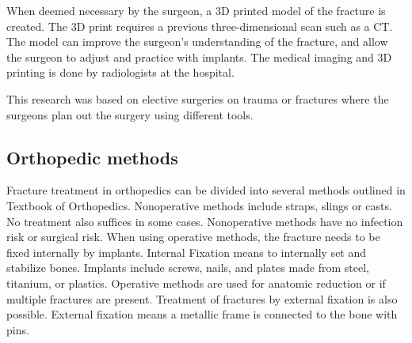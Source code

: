 \documentclass[a4paper]{report}
\begin{document}
When deemed necessary by the surgeon, a 3D printed model of the fracture is created. The 3D print requires a previous three-dimensional scan such as a CT. The model can improve the surgeon's understanding of the fracture, and allow the surgeon to adjust and practice with implants. The medical imaging and 3D printing is done by radiologists at the hospital.

This research was based on elective surgeries on trauma or fractures where the surgeons plan out the surgery using different tools.

\subsection{Orthopedic methods}

Fracture treatment in orthopedics can be divided into several methods outlined in Textbook of Orthopedics\cite{ebnezar_textbook_2016}.
Nonoperative methods include straps, slings or casts. No treatment also suffices in some cases.
Nonoperative methods have no infection risk or surgical risk.
When using operative methods, the fracture needs to be fixed internally by implants.
Internal Fixation means to internally set and stabilize bones\cite{ebnezar_textbook_2016}.
Implants include screws, nails, and plates made from steel, titanium, or plastics.
Operative methods are used for anatomic reduction or if multiple fractures are present.
Treatment of fractures by external fixation is also possible. External fixation means a metallic frame is connected to the bone with pins.

\end{document}
